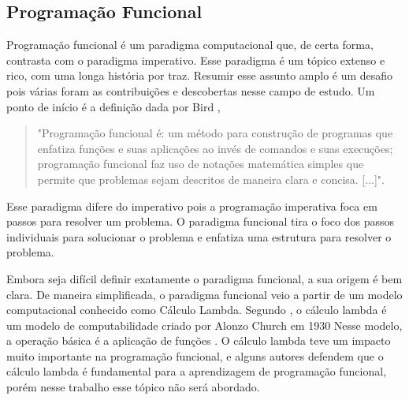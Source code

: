 \subsection{Programação Funcional}


Programação funcional é um paradigma computacional que, de certa forma, contrasta com o paradigma imperativo.
Esse paradigma é um tópico extenso e rico, com uma longa história por traz.
Resumir esse assunto amplo é um desafio pois várias foram as contribuições e descobertas nesse campo de estudo.
Um ponto de início é a definição dada por Bird \cite{Bird},
\begin{quotation}
"Programação funcional é: um método para construção de programas que enfatiza funções e suas aplicações ao invés de comandos e suas execuções; programação funcional faz uso de notações matemática simples que permite que problemas sejam descritos de maneira clara e concisa. [...]".
\end{quotation}
Esse paradigma difere do imperativo pois a programação imperativa foca em passos para resolver um problema.
O paradigma funcional tira o foco dos passos individuais para solucionar o problema e enfatiza uma estrutura para resolver o problema.

Embora seja difícil definir exatamente o paradigma funcional, a sua origem é bem clara.
De maneira simplificada, o paradigma funcional veio a partir de um modelo computacional conhecido como Cálculo Lambda.
Segundo \cite{lambda}, o cálculo lambda é um modelo de computabilidade criado por Alonzo Church em 1930
Nesse modelo, a operação básica é a aplicação de funções \cite{lambda}.
O cálculo lambda teve um impacto muito importante na programação funcional, e alguns autores defendem que o cálculo lambda é fundamental para a aprendizagem de programação funcional, porém nesse trabalho esse tópico não será abordado.

